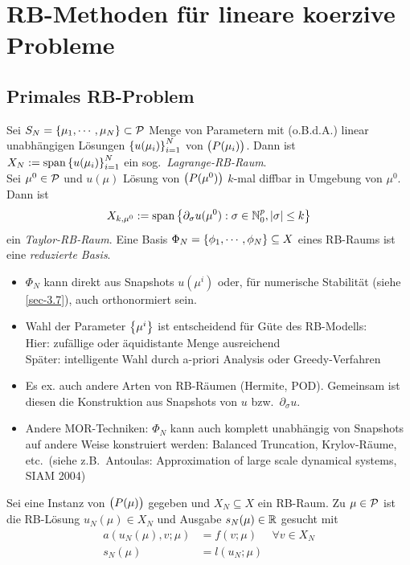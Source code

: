 \section{RB-Methoden für lineare koerzive Probleme}
\label{sec-3}

\subsection{Primales RB-Problem}
\label{sec-3.1}

\begin{defn}
	Sei $S_N = \set{\mu_1,\cdots,\mu_N} \subset \p$ Menge von Parametern mit (o.B.d.A.) linear unabhängigen Lösungen $\set{u(\mu_i)}_{i=1}^N$ von $\prob[\mu_i]$.
	Dann ist $X_N := \spn{\set{u(\mu_i)}_{i=1}^N}$ ein sog.\ \emph{Lagrange-RB-Raum}.\\
	Sei $\mu^0 \in \p$ und $u(\mu)$ Lösung von $\prob[\mu^0]$ $k$-mal diffbar in Umgebung von $\mu^0$.
	Dann ist
	\[
		X_{k,\mu^0} := \spn{\set{\partial_\sigma u(\mu^0) : \sigma \in \N_0^p, |\sigma| \leq k}}
	\]
	ein \emph{Taylor-RB-Raum}.
	Eine Basis $\Phi_N = \set{\phi_1,\cdots,\phi_N} \subseteq X$ eines RB-Raums ist eine \emph{reduzierte Basis}.
\end{defn}

\begin{bem} \beginwithlistbem
	\begin{itemize}
		\item $\Phi_N$ kann direkt aus Snapshots $u(\mu^i)$ oder, für numerische Stabilität (siehe \ref{sec-3.7}), auch orthonormiert sein.
		\item Wahl der Parameter $\set{\mu^i}$ ist entscheidend für Güte des RB-Modells:\\
			Hier: zufällige oder äquidistante Menge ausreichend\\
			Später: intelligente Wahl durch a-priori Analysis oder Greedy-Verfahren
		\item Es ex. auch andere Arten von RB-Räumen (Hermite, POD).
			Gemeinsam ist diesen die Konstruktion aus Snapshots von $u$ bzw.\ $\partial_\sigma u$.
		\item Andere MOR-Techniken: $\Phi_N$ kann auch komplett unabhängig von Snapshots auf andere Weise konstruiert werden: Balanced Truncation, Krylov-Räume, etc.\ (siehe z.B.\ Antoulas: Approximation of large scale dynamical systems, SIAM 2004)
	\end{itemize}
\end{bem}

\begin{defn}
	Sei eine Instanz von $\prob$ gegeben und $X_N \subseteq X$ ein RB-Raum.
	Zu $\mu \in \p$ ist die RB-Lösung $u_N(\mu) \in X_N$ und Ausgabe $s_N(\mu) \in \R$ gesucht mit
	\begin{align*}
		a(u_N(\mu),v;\mu) &= f(v;\mu) &\forall v \in X_N\\
		s_N(\mu) &= l(u_N;\mu)
	\end{align*}
\end{defn}

